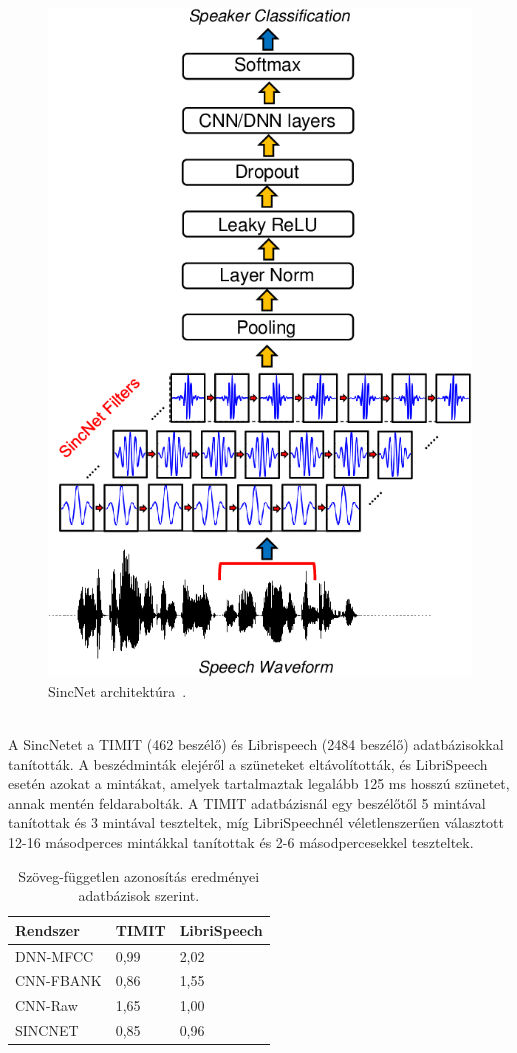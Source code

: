 \begin{figure}[!ht]
	\centering
	\includegraphics[width=120mm, keepaspectratio]{figures/sincnet-nn.png}
	\caption{SincNet architektúra~\cite{sincnet}.}
	\label{fig:sincnet-nn}
\end{figure}
\ \\
\newline
A SincNetet a TIMIT (462 beszélő) és Librispeech (2484 beszélő) adatbázisokkal tanították.
A beszédminták elejéről a szüneteket eltávolították, és LibriSpeech esetén azokat a mintákat, amelyek tartalmaztak legalább 125 ms hosszú szünetet, annak mentén feldarabolták. A TIMIT adatbázisnál egy beszélőtől 5 mintával tanítottak és 3 mintával teszteltek, míg LibriSpeechnél véletlenszerűen választott 12-16 másodperces mintákkal tanítottak és 2-6 másodpercesekkel teszteltek.
\newline
\begin{table}[!ht]
	\begin{tabular}{*3l} \toprule
		\bfseries Rendszer & \bfseries TIMIT & \bfseries LibriSpeech \\ \midrule
		DNN-MFCC & 0,99 & 2,02 \\
		\rowcolor{gray!10} 
		CNN-FBANK & 0,86 & 1,55 \\
		CNN-Raw  & 1,65 & 1,00 \\
		\rowcolor{gray!10} 
		SINCNET & 0,85 & 0,96 \\
		\bottomrule
		\hline
	\end{tabular}
	\centering
	\caption{Szöveg-független azonosítás eredményei adatbázisok szerint.}
	\label{fig:sincnet-identification}
\end{table}

